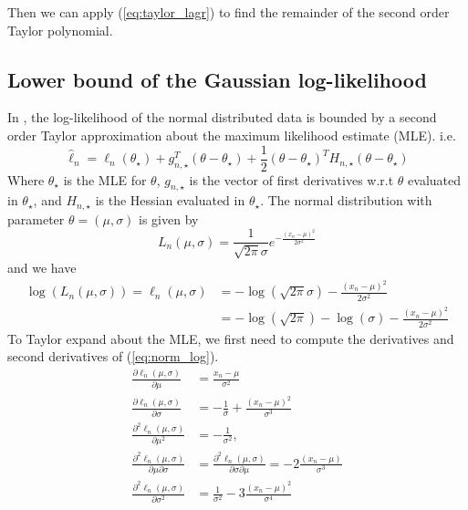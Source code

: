  Then we can apply (\ref{eq:taylor_lagr}) to find the remainder of the second order Taylor polynomial. 
\subsection{Lower bound of the Gaussian log-likelihood}
In \cite{Bardenet:1}, the log-likelihood of the normal distributed data is bounded by a second order Taylor approximation about the maximum likelihood estimate (MLE). i.e. 
\begin{equation}
  \hat{\ell}_n = \ell_n(\theta_{\star} ) + g_{n,\star}^T\left(\theta - \theta_{\star}\right) + \frac{1}{2}\left(\theta - \theta_{\star}\right)^T H_{n, \star}\left(\theta - \theta_{\star}\right)
\end{equation}
Where $\theta_{\star}$ is the MLE for $\theta$, $g_{n,\star}$ is the vector of first derivatives w.r.t $\theta$ evaluated in $\theta_{\star}$, and $H_{n, \star}$ is the Hessian evaluated in $\theta_{\star}$. The normal distribution with parameter $\theta = (\mu, \sigma)$  is given by 
\begin{equation}
    L_n(\mu, \sigma) = \frac{1}{\sqrt{2\pi}\sigma}e^{-\frac{\left(x_n-\mu\right)^2}{2\sigma^2}}
\end{equation}
and we have 
\begin{equation}\label{eq:norm_log}
\begin{split}
    \log\left(L_n(\mu, \sigma)\right) = \ell_n(\mu, \sigma) &= -\log\left(\sqrt{2\pi}\sigma\right) - \frac{\left(x_n - \mu\right)^2}{2\sigma^2} \\
    &= - \log\left(\sqrt{2\pi}\right) - \log\left(\sigma\right) - \frac{\left(x_n-\mu\right)^2}{2\sigma^2}
\end{split}
\end{equation}
To Taylor expand about the MLE, we first need to compute the derivatives and second derivatives of (\ref{eq:norm_log}). 
\begin{equation}
    \begin{split}
    \frac{\partial \ell_n\left(\mu, \sigma\right)}{\partial \mu} &= \frac{x_n - \mu}{\sigma^2} 
    \\ \frac{\partial \ell_n\left(\mu, \sigma\right)}{\partial \sigma} &= -\frac{1}{\sigma}  + \frac{\left(x_n - \mu \right)^2}{\sigma^3}\\
    \frac{\partial^2\ell_n(\mu, \sigma)}{\partial \mu ^2} &= -\frac{1}{\sigma^2}, \\ 
    \frac{\partial^2 \ell_n(\mu, \sigma)}{\partial\mu\partial \sigma} &=  \frac{\partial^2 \ell_n(\mu, \sigma)}{\partial \sigma \partial \mu} = -2\frac{(x_n - \mu)}{\sigma^3} \\  \frac{\partial^2 \ell_n(\mu, \sigma)}{\partial \sigma^2} &= \frac{1}{\sigma^2} - 3\frac{(x_n - \mu)^2}{\sigma^4}
\end{split}
\end{equation}
